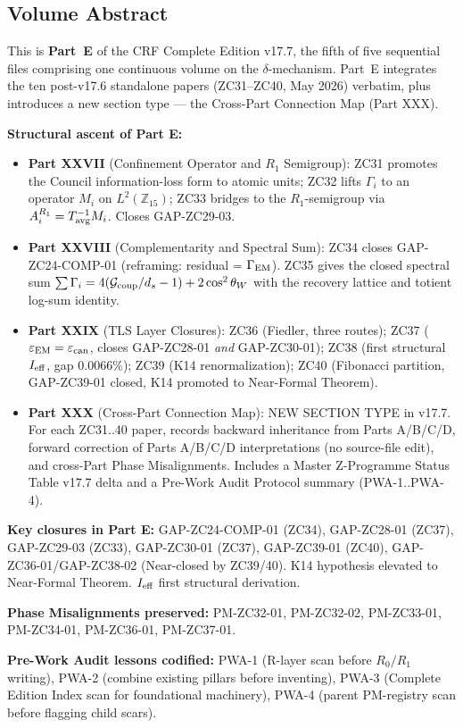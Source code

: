 \documentclass[11pt, a4paper]{article}
\newcommand{\cwsq}{\cos^2\theta_W}
\newcommand{\Zft}{\mathbb{Z}_{15}}  %
\newcommand{\Gcoup}{\mathcal{G}_{\rm coup}}
\newcommand{\epscan}{\varepsilon_{\rm can}}
\newcommand{\epsEM}{\varepsilon_{\rm EM}}
\newcommand{\Tavg}{T_{\rm avg}}
\begin{document}
\subsection*{Volume Abstract}

\begin{volumebox}[title={Part E --- CRF Complete Edition v17.7 (Parts XXVII--XXX)}]
\sloppy
This is \textbf{Part~E} of the CRF Complete Edition v17.7, the fifth
of five sequential files comprising one continuous volume on the
$\delta$-mechanism. Part~E integrates the ten post-v17.6 standalone
papers (ZC31--ZC40, May 2026) verbatim, plus introduces a new section
type --- the Cross-Part Connection Map (Part XXX).

\textbf{Structural ascent of Part E:}
\begin{itemize}[noitemsep,leftmargin=1.5em]
  \item \textbf{Part XXVII} (Confinement Operator and $R_1$ Semigroup):
    ZC31 promotes the Council information-loss form
    to atomic units; ZC32 lifts $\Gamma_i$ to an operator $M_i$ on
    $L^2(\Zft)$; ZC33 bridges to the $R_1$-semigroup via
    $A_i^{R_1} = \Tavg^{-1} M_i$. Closes GAP-ZC29-03.
  \item \textbf{Part XXVIII} (Complementarity and Spectral Sum):
    ZC34 closes GAP-ZC24-COMP-01 (reframing: residual = $\Gamma_{\rm EM}$).
    ZC35 gives the closed spectral sum $\sum\Gamma_i = 4(\Gcoup/d_s - 1)
    + 2\cwsq$ with the recovery lattice and totient log-sum identity.
  \item \textbf{Part XXIX} (TLS Layer Closures):
    ZC36 (Fiedler, three routes); ZC37 ($\epsEM = \epscan$, closes
    GAP-ZC28-01 \emph{and} GAP-ZC30-01); ZC38 (first structural
    $I_{\rm eff}$, gap $0.0066\%$); ZC39 (K14 renormalization);
    ZC40 (Fibonacci partition, GAP-ZC39-01 closed, K14 promoted
    to Near-Formal Theorem).
  \item \textbf{Part XXX} (Cross-Part Connection Map):
    NEW SECTION TYPE in v17.7. For each ZC31..40 paper, records
    backward inheritance from Parts A/B/C/D, forward correction of
    Parts A/B/C/D interpretations (no source-file edit), and
    cross-Part Phase Misalignments. Includes a Master Z-Programme
    Status Table v17.7 delta and a Pre-Work Audit Protocol summary
    (PWA-1..PWA-4).
\end{itemize}

\textbf{Key closures in Part E:}
GAP-ZC24-COMP-01 (ZC34), GAP-ZC28-01 (ZC37), GAP-ZC29-03 (ZC33),
GAP-ZC30-01 (ZC37), GAP-ZC39-01 (ZC40), GAP-ZC36-01/GAP-ZC38-02
(Near-closed by ZC39/40). K14 hypothesis elevated to Near-Formal
Theorem. $I_{\rm eff}$ first structural derivation.

\textbf{Phase Misalignments preserved:}
PM-ZC32-01, PM-ZC32-02, PM-ZC33-01, PM-ZC34-01, PM-ZC36-01, PM-ZC37-01.

\textbf{Pre-Work Audit lessons codified:} PWA-1 (R-layer scan before
$R_0/R_1$ writing), PWA-2 (combine existing pillars before inventing),
PWA-3 (Complete Edition Index scan for foundational machinery),
PWA-4 (parent PM-registry scan before flagging child scars).
\end{volumebox}
\end{document}
